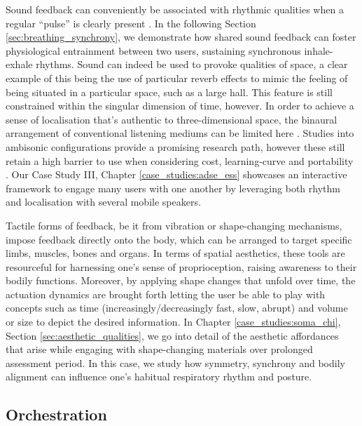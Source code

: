 Sound feedback can conveniently be associated with rhythmic qualities when a regular ``pulse'' is clearly present \cite{danielsen_moving_2015}. In the following Section \ref{sec:breathing_synchrony}, we demonstrate how shared sound feedback can foster physiological entrainment between two users, sustaining synchronous inhale-exhale rhythms. Sound can indeed be used to provoke qualities of space, a clear example of this being the use of particular reverb effects to mimic the feeling of being situated in a particular space, such as a large hall. This feature is still constrained within the singular dimension of time, however. In order to achieve a sense of localisation that's authentic to three-dimensional space, the binaural arrangement of conventional listening mediums can be limited here \cite{chang_impairments_2018}. Studies into ambisonic configurations provide a promising research path, however these still retain a high barrier to use when considering cost, learning-curve and portability \cite{huisman_sound_2021}. Our Case Study III, Chapter \ref{case_studies:adse_ess} showcases an interactive framework to engage many users with one another by leveraging both rhythm and localisation with several mobile speakers.

Tactile forms of feedback, be it from vibration or shape-changing mechanisms, impose feedback directly onto the body, which can be arranged to target specific limbs, muscles, bones and organs. In terms of spatial aesthetics, these tools are resourceful for harnessing one's sense of proprioception, raising awareness to their bodily functions. Moreover, by applying shape changes that unfold over time, the actuation dynamics are brought forth letting the user be able to play with concepts such as time (increasingly/decreasingly fast, slow, abrupt) and volume or size to depict the desired information. In Chapter \ref{case_studies:soma_chi}, Section \ref{sec:aesthetic_qualities}, we go into detail of the aesthetic affordances that arise while engaging with shape-changing materials over prolonged assessment period. In this case, we study how symmetry, synchrony and bodily alignment can influence one's habitual respiratory rhythm and posture.

\subsection*{Orchestration}

